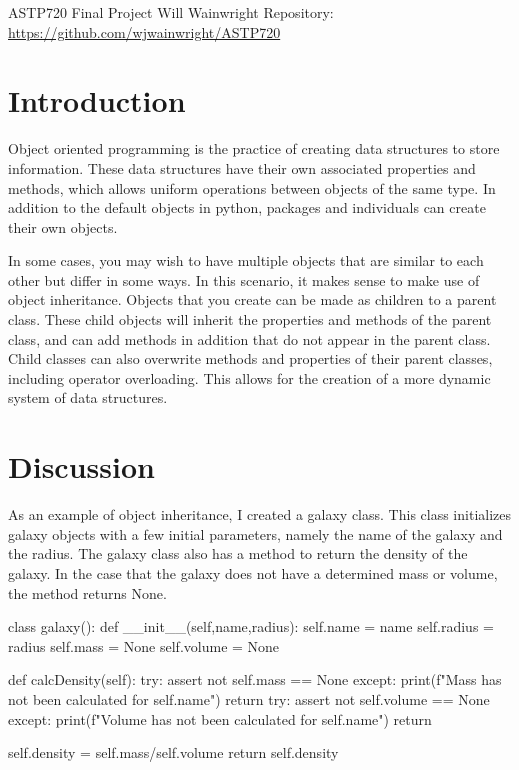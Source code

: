 \documentclass[twocolumn,11pt]{article}
\begin{document}
\pagestyle{plain}
\begin{onecolumn}
ASTP720 
\newline Final Project
\newline Will Wainwright
\newline Repository: \href{https://github.com/wjwainwright/ASTP720}{https://github.com/wjwainwright/ASTP720}
\end{onecolumn}
\section*{Introduction}
Object oriented programming is the practice of creating data structures to store information. These data structures have their own associated properties and methods, which allows uniform operations between objects of the same type. In addition to the default objects in python, packages and individuals can create their own objects. 

In some cases, you may wish to have multiple objects that are similar to each other but differ in some ways. In this scenario, it makes sense to make use of object inheritance. Objects that you create can be made as children to a parent class. These child objects will inherit the properties and methods of the parent class, and can add methods in addition that do not appear in the parent class. Child classes can also overwrite methods and properties of their parent classes, including operator overloading. This allows for the creation of a more dynamic system of data structures.

\section*{Discussion}
As an example of object inheritance, I created a galaxy class. This class initializes galaxy objects with a few initial parameters, namely the name of the galaxy and the radius. The galaxy class also has a method to return the density of the galaxy. In the case that the galaxy does not have a determined mass or volume, the method returns None.
\newline
\begin{python}
class galaxy():
    def __init__(self,name,radius):
        self.name = name
        self.radius = radius
        self.mass = None
        self.volume = None
    
    def calcDensity(self):
        try:
            assert not self.mass == None
        except:
            print(f"Mass has not been calculated for {self.name}")
            return
        try:
            assert not self.volume == None
        except:
            print(f"Volume has not been calculated for {self.name}")
            return
        
        self.density = self.mass/self.volume
        return self.density
\end{python}
\end{document}
